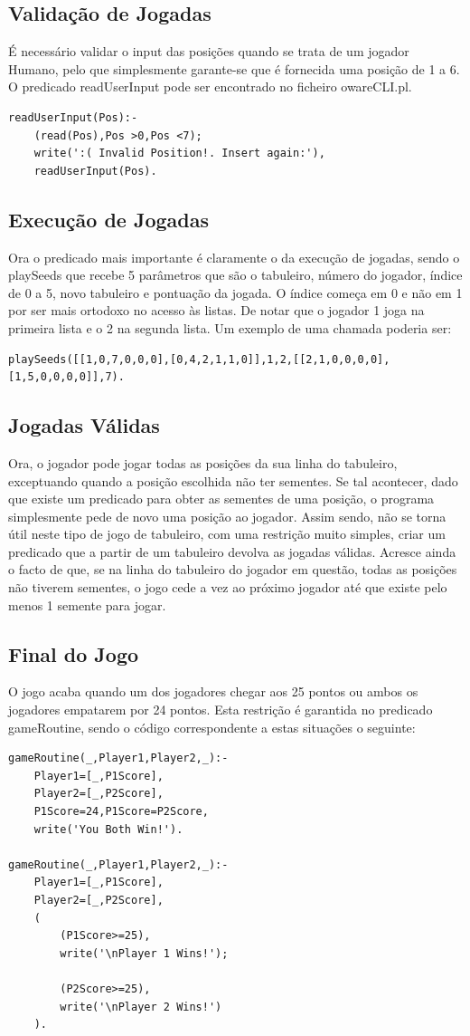 \documentclass[15pt,a4paper]{article}
\begin{document}
\subsection{Validação de Jogadas}
É necessário validar o input das posições quando se trata de um jogador Humano, pelo que simplesmente garante-se que é fornecida uma posição de 1 a 6. O predicado readUserInput pode ser encontrado no ficheiro owareCLI.pl.
\begin{verbatim}
readUserInput(Pos):-
	(read(Pos),Pos >0,Pos <7);
	write(':( Invalid Position!. Insert again:'),
	readUserInput(Pos).
\end{verbatim}

\subsection{Execução de Jogadas}
Ora o predicado mais importante é claramente o da execução de jogadas, sendo o playSeeds que recebe 5 parâmetros que são o tabuleiro, número do jogador, índice de 0 a 5, novo tabuleiro e pontuação da jogada. O índice começa em 0 e não em 1 por ser mais ortodoxo no acesso às listas. De notar que o jogador 1 joga na primeira lista e o 2 na segunda lista. Um exemplo de uma chamada poderia ser:
\begin{verbatim}
playSeeds([[1,0,7,0,0,0],[0,4,2,1,1,0]],1,2,[[2,1,0,0,0,0],[1,5,0,0,0,0]],7).
\end{verbatim}

\subsection{Jogadas Válidas}
Ora, o jogador pode jogar todas as posições da sua linha do tabuleiro, exceptuando quando a posição escolhida não ter sementes. Se tal acontecer, dado que existe um predicado para obter as sementes de uma posição, o programa simplesmente pede de novo uma posição ao jogador. Assim sendo, não se torna útil neste tipo de jogo de tabuleiro, com uma restrição muito simples, criar um predicado que a partir de um tabuleiro devolva as jogadas válidas. Acresce ainda o facto de que, se na linha do tabuleiro do jogador em questão, todas as posições não tiverem sementes, o jogo cede a vez ao próximo jogador até que existe pelo menos 1 semente para jogar. 


\subsection{Final do Jogo}
O jogo acaba quando um dos jogadores chegar aos 25 pontos ou ambos os jogadores empatarem por 24 pontos. Esta restrição é garantida no predicado gameRoutine, sendo o código correspondente a estas situações o seguinte:
\begin{verbatim}
gameRoutine(_,Player1,Player2,_):-
	Player1=[_,P1Score],
	Player2=[_,P2Score],
	P1Score=24,P1Score=P2Score,
	write('You Both Win!').

gameRoutine(_,Player1,Player2,_):-
	Player1=[_,P1Score],
	Player2=[_,P2Score],
	(
		(P1Score>=25),
		write('\nPlayer 1 Wins!');

		(P2Score>=25),
		write('\nPlayer 2 Wins!')
	).
\end{verbatim}
\end{document}
